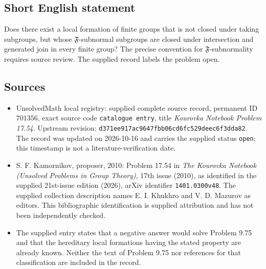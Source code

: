 \documentclass[11pt]{article}
\begin{document}
\subsection{Short English statement}
Does there exist a local formation of finite groups that is not closed under taking subgroups, but whose \(\mathfrak F\)-subnormal subgroups are closed under intersection and generated join in every finite group? The precise convention for \(\mathfrak F\)-subnormality requires source review. The supplied record labels the problem open.
\subsection{Sources}
\begin{itemize}
\item UnsolvedMath local registry: supplied complete source record, permanent ID \(701356\), exact source code \texttt{catalogue entry}, title \emph{Kourovka Notebook Problem 17.54}. Upstream revision: \texttt{d371ee917ac9647fbb06cd6fc529deec6f3dda82}. The record was updated on 2026-10-16 and carries the supplied status \texttt{open}; this timestamp is not a literature-verification date.
\item S. F. Kamornikov, proposer, 2010: Problem 17.54 in \emph{The Kourovka Notebook (Unsolved Problems in Group Theory)}, 17th issue (2010), as identified in the supplied 21st-issue edition (2026), arXiv identifier \texttt{1401.0300v48}. The supplied collection description names E. I. Khukhro and V. D. Mazurov as editors. This bibliographic identification is supplied attribution and has not been independently checked.
\item The supplied entry states that a negative answer would solve Problem 9.75 and that the hereditary local formations having the stated property are already known. Neither the text of Problem 9.75 nor references for that classification are included in the record.
\end{itemize}
\end{document}
